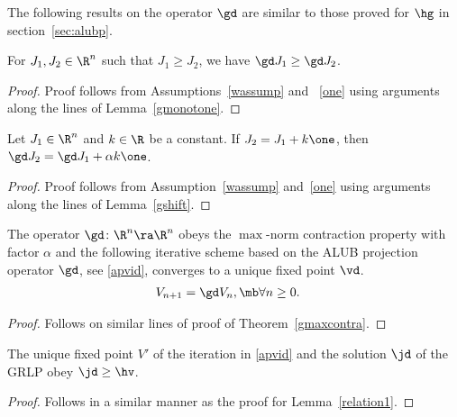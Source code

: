 The following results on the operator $\gd$ are similar to those proved for $\hg$ in section~\ref{sec:alubp}.
\begin{lemma}\label{gdmonotone}
For $J_1, J_2\in \R^n$ such that $J_1\geq J_2$, we have $\gd J_1\geq \gd J_2$.
\end{lemma}
\begin{proof}
Proof follows from Assumptions~\ref{wassump} and ~\ref{one} using arguments along the lines of Lemma~\ref{gmonotone}.
\end{proof}
\begin{lemma}\label{gdshift}
Let $J_1\in \R^n$ and $k\in \R$ be a constant. If $J_2=J_1+k\one$, then $\gd J_2=\gd J_1+\alpha k\one$.
\end{lemma}
\begin{proof}
Proof follows from Assumption~\ref{wassump} and~\ref{one} using arguments along the lines of Lemma~\ref{gshift}.
\end{proof}
\begin{theorem}\label{gdmaxcontra}
The operator $\gd \colon \R^n\ra \R^n$ obeys the $\max$-norm contraction property with factor $\alpha$ and the following iterative scheme based on the ALUB projection operator $\gd$, see \eqref{apvid}, converges to a unique fixed point $\vd$.
\begin{align}\label{apvid}
V_{n+1}&=\gd V_n,\mb\forall n\geq 0.
\end{align}
\end{theorem}
\begin{proof}
Follows on similar lines of proof of Theorem~\ref{gmaxcontra}.
\end{proof}
\begin{lemma}\label{relation2}
The unique fixed point $V'$ of the iteration in \eqref{apvid} and the solution $\jd$ of the GRLP obey $\jd\geq\hv$.
\end{lemma}
\begin{proof}
Follows in a similar manner as the proof for Lemma~\ref{relation1}.
\end{proof}



